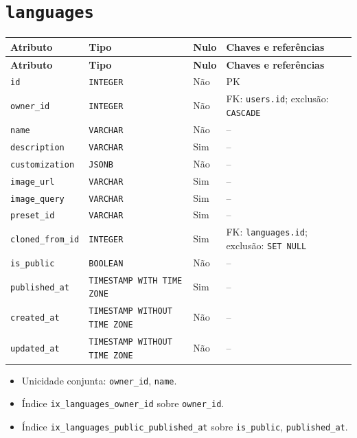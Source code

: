 \section*{\texttt{languages}}
\begingroup\footnotesize
\setlength{\tabcolsep}{4pt}\renewcommand{\arraystretch}{1.15}
\begin{longtable}{|>{\raggedright\arraybackslash}p{}|>{\raggedright\arraybackslash}p{}|>{\raggedright\arraybackslash}p{}|>{\raggedright\arraybackslash}p{}|}
\hline
\textbf{Atributo} & \textbf{Tipo} & \textbf{Nulo} & \textbf{Chaves e referências} \\ \hline
\endfirsthead
\hline \textbf{Atributo} & \textbf{Tipo} & \textbf{Nulo} & \textbf{Chaves e referências} \\ \hline
\endhead
\texttt{id} & \texttt{INTEGER} & Não & PK \\ \hline
\texttt{owner\_\allowbreak{}id} & \texttt{INTEGER} & Não & FK: \texttt{users.id}; exclusão: \texttt{CASCADE} \\ \hline
\texttt{name} & \texttt{VARCHAR} & Não & -- \\ \hline
\texttt{description} & \texttt{VARCHAR} & Sim & -- \\ \hline
\texttt{customization} & \texttt{JSONB} & Não & -- \\ \hline
\texttt{image\_\allowbreak{}url} & \texttt{VARCHAR} & Sim & -- \\ \hline
\texttt{image\_\allowbreak{}query} & \texttt{VARCHAR} & Sim & -- \\ \hline
\texttt{preset\_\allowbreak{}id} & \texttt{VARCHAR} & Sim & -- \\ \hline
\texttt{cloned\_\allowbreak{}from\_\allowbreak{}id} & \texttt{INTEGER} & Sim & FK: \texttt{languages.id}; exclusão: \texttt{SET NULL} \\ \hline
\texttt{is\_\allowbreak{}public} & \texttt{BOOLEAN} & Não & -- \\ \hline
\texttt{published\_\allowbreak{}at} & \texttt{TIMESTAMP WITH TIME ZONE} & Sim & -- \\ \hline
\texttt{created\_\allowbreak{}at} & \texttt{TIMESTAMP WITHOUT TIME ZONE} & Não & -- \\ \hline
\texttt{updated\_\allowbreak{}at} & \texttt{TIMESTAMP WITHOUT TIME ZONE} & Não & -- \\ \hline
\end{longtable}
\begin{itemize}
\item Unicidade conjunta: \texttt{owner\_\allowbreak{}id}, \texttt{name}.
\item Índice \texttt{ix\_\allowbreak{}languages\_\allowbreak{}owner\_\allowbreak{}id} sobre \texttt{owner\_\allowbreak{}id}.
\item Índice \texttt{ix\_\allowbreak{}languages\_\allowbreak{}public\_\allowbreak{}published\_\allowbreak{}at} sobre \texttt{is\_\allowbreak{}public}, \texttt{published\_\allowbreak{}at}.
\end{itemize}
\endgroup

